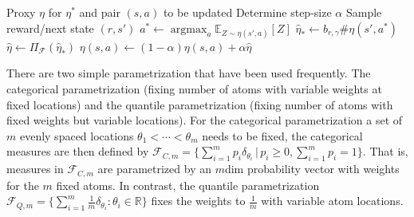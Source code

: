 \documentclass{article}
\theoremstyle{plain}
\theoremstyle{definition}
\theoremstyle{remark}
\begin{document}
\begin{algorithm}[h]
\caption{Distributional $Q$-learning update step}
\label{alg:CDRL}
\begin{algorithmic}
\REQUIRE Proxy $\eta$ for $\eta^*$ and pair $(s,a)$ to be updated
\STATE Determine step-size $\alpha$
\STATE Sample reward/next state $(r, s')$
\STATE $a^* \gets \operatorname{argmax}_a \mathbb{E}_{Z \sim \eta(s',a)} [Z]$
\STATE $\hat{\eta}_* \gets b_{r, \gamma} \#\eta(s',a^*)$\\
\STATE $\hat{\eta} \gets \Pi_{\mathcal F} (\hat{\eta}_*)$
\STATE $\eta(s,a) \leftarrow (1 - \alpha)\eta(s,a) + \alpha\hat{\eta}$
\end{algorithmic}
\end{algorithm}
 There are two simple parametrization that have been used frequently. The categorical parametrization (fixing number of atoms with variable weights at fixed locations) and the quantile parametrization (fixing number of atoms with fixed weights but variable locations). For the categorical parametrization a set of \( m \) evenly spaced locations \( \theta_1 < \cdots < \theta_m \) needs to be fixed, the categorical measures are then defined by $\mathcal{F}_{C,m} = \big\{ \sum_{i=1}^{m} p_i\delta_{\theta_i}\, \big|\, p_i \geq 0, \sum_{i=1}^{m} p_i = 1 \big\}.$ That is, measures in $\mathcal F_{C,m}$ are parametrized by an $m$dim probability vector with weights for the $m$ fixed atoms. In contrast, the quantile parametrization $\mathcal{F}_{Q,m} = \Big\{  \sum_{i=1}^{m}\frac{1}{m} \delta_{\theta_i} : \theta_i \in \mathbb{R} \Big\}$ fixes the weights to $\frac 1 m$ with variable atom locations.
\end{document}
